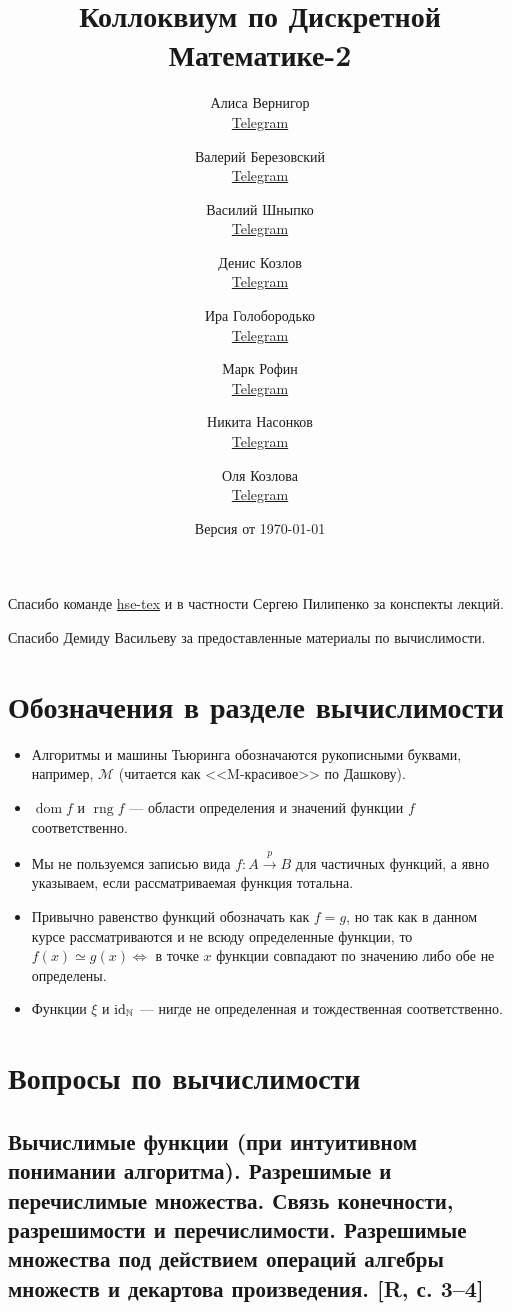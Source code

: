 \documentclass[a4paper, fleqn]{article}
\title{Коллоквиум по Дискретной Математике-2}
\author{

    Алиса Вернигор       \\ \href{https://t.me/allisyonok}{Telegram} \and
    Валерий Березовский  \\ \href{https://t.me/jeembogod}{Telegram} \and
    Василий Шныпко       \\ \href{https://t.me/yourvash}{Telegram} \and
    Денис Козлов         \\ \href{https://t.me/DKozl50}{Telegram} \and
    Ира Голобородько     \\ \href{https://t.me/Ira4kgl}{Telegram} \and
    Марк Рофин           \\ \href{https://t.me/Broccoliman}{Telegram} \and
    Никита Насонков      \\ \href{https://t.me/nnv_nick}{Telegram} \and
    Оля Козлова          \\ \href{https://t.me/grenlayk}{Telegram}
}
\date{Версия от {\ddmmyyyydate\today} \currenttime}
\DeclareMathOperator{\dom}{\mathop{\mathrm{dom}}}
\DeclareMathOperator{\rng}{\mathop{\mathrm{rng}}}
\begin{document}
    \maketitle

    Спасибо команде \href{https://github.com/hse-tex/hse-tex}{hse-tex} 
    и в частности Сергею Пилипенко за конспекты лекций. 

    Спасибо Демиду Васильеву за предоставленные материалы по вычислимости.

    \tableofcontents

    \newpage

\section{Обозначения в разделе вычислимости}

    \begin{itemize}
        \item Алгоритмы и машины Тьюринга обозначаются рукописными буквами, например, $\mathcal{M}$ (читается как <<M-красивое>> по Дашкову).

        \item $\dom f$ и $\rng f$ --- области определения и значений функции $f$ соответственно.

        \item Мы не пользуемся записью вида $f : A \xrightarrow{p} B$ для частичных функций, а явно указываем, если рассматриваемая функция тотальна.

        \item Привычно равенство функций обозначать как $f = g$, но так как в данном курсе рассматриваются и не всюду определенные функции, то $f(x) \simeq g(x) \iff$ в точке $x$ функции совпадают по значению либо обе не определены.

        \item Функции $\xi$ и $\text{id}_{\mathbb{N}}$ --- нигде не определенная и тождественная соответственно.
    \end{itemize}

\section{Вопросы по вычислимости}

    \subsection{Вычислимые функции (при интуитивном понимании алгоритма). Разрешимые и перечислимые множества. Связь конечности, разрешимости и перечислимости. Разрешимые множества под действием операций алгебры множеств и декартова произведения. [R, с. 3–4]}
\end{document}
